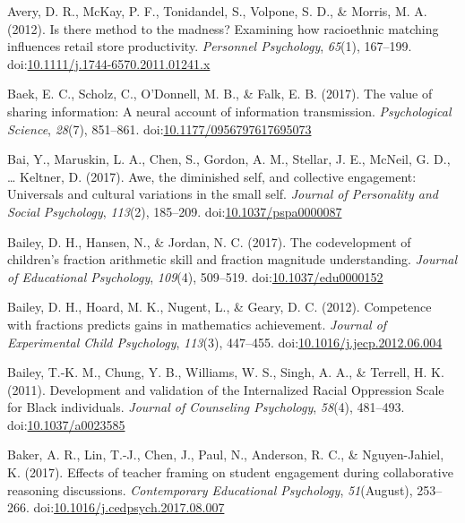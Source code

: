 \documentclass[english,man]{apa6}
\theoremstyle{definition}
\theoremstyle{definition}
\theoremstyle{definition}
\theoremstyle{remark}
\begin{document}
\hypertarget{ref-Avery2012}{}
Avery, D. R., McKay, P. F., Tonidandel, S., Volpone, S. D., \& Morris,
M. A. (2012). Is there method to the madness? Examining how racioethnic
matching influences retail store productivity. \emph{Personnel
Psychology}, \emph{65}(1), 167--199.
doi:\href{https://doi.org/10.1111/j.1744-6570.2011.01241.x}{10.1111/j.1744-6570.2011.01241.x}

\hypertarget{ref-Baek2017}{}
Baek, E. C., Scholz, C., O'Donnell, M. B., \& Falk, E. B. (2017). The
value of sharing information: A neural account of information
transmission. \emph{Psychological Science}, \emph{28}(7), 851--861.
doi:\href{https://doi.org/10.1177/0956797617695073}{10.1177/0956797617695073}

\hypertarget{ref-Bai2017}{}
Bai, Y., Maruskin, L. A., Chen, S., Gordon, A. M., Stellar, J. E.,
McNeil, G. D., \ldots{} Keltner, D. (2017). Awe, the diminished self,
and collective engagement: Universals and cultural variations in the
small self. \emph{Journal of Personality and Social Psychology},
\emph{113}(2), 185--209.
doi:\href{https://doi.org/10.1037/pspa0000087}{10.1037/pspa0000087}

\hypertarget{ref-Bailey2017}{}
Bailey, D. H., Hansen, N., \& Jordan, N. C. (2017). The codevelopment of
children's fraction arithmetic skill and fraction magnitude
understanding. \emph{Journal of Educational Psychology}, \emph{109}(4),
509--519.
doi:\href{https://doi.org/10.1037/edu0000152}{10.1037/edu0000152}

\hypertarget{ref-Bailey2012}{}
Bailey, D. H., Hoard, M. K., Nugent, L., \& Geary, D. C. (2012).
Competence with fractions predicts gains in mathematics achievement.
\emph{Journal of Experimental Child Psychology}, \emph{113}(3),
447--455.
doi:\href{https://doi.org/10.1016/j.jecp.2012.06.004}{10.1016/j.jecp.2012.06.004}

\hypertarget{ref-Bailey2011}{}
Bailey, T.-K. M., Chung, Y. B., Williams, W. S., Singh, A. A., \&
Terrell, H. K. (2011). Development and validation of the Internalized
Racial Oppression Scale for Black individuals. \emph{Journal of
Counseling Psychology}, \emph{58}(4), 481--493.
doi:\href{https://doi.org/10.1037/a0023585}{10.1037/a0023585}

\hypertarget{ref-Baker2017}{}
Baker, A. R., Lin, T.-J., Chen, J., Paul, N., Anderson, R. C., \&
Nguyen-Jahiel, K. (2017). Effects of teacher framing on student
engagement during collaborative reasoning discussions.
\emph{Contemporary Educational Psychology}, \emph{51}(August), 253--266.
doi:\href{https://doi.org/10.1016/j.cedpsych.2017.08.007}{10.1016/j.cedpsych.2017.08.007}
\end{document}
